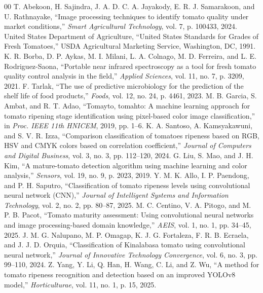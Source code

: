\documentclass[conference,pageno]{IEEEtran}
\begin{document}
\begin{thebibliography}{00}
 T. Abekoon, H. Sajindra, J. A. D. C. A. Jayakody, E. R. J. Samarakoon, and U. Rathnayake, ``Image processing techniques to identify tomato quality under market conditions,'' \textit{Smart Agricultural Technology}, vol. 7, p. 100433, 2024.
 United States Department of Agriculture, ``United States Standards for Grades of Fresh Tomatoes,'' USDA Agricultural Marketing Service, Washington, DC, 1991.
 K. R. Borba, D. P. Aykas, M. I. Milani, L. A. Colnago, M. D. Ferreira, and L. E. Rodriguez-Saona, ``Portable near infrared spectroscopy as a tool for fresh tomato quality control analysis in the field,'' \textit{Applied Sciences}, vol. 11, no. 7, p. 3209, 2021.
 F. Tarlak, ``The use of predictive microbiology for the prediction of the shelf life of food products,'' \textit{Foods}, vol. 12, no. 24, p. 4461, 2023.
 M. B. Garcia, S. Ambat, and R. T. Adao, ``Tomayto, tomahto: A machine learning approach for tomato ripening stage identification using pixel-based color image classification,'' in \textit{Proc. IEEE 11th HNICEM}, 2019, pp. 1--6.
 K. A. Santoso, A. Kamsyakawuni, and S. V. R. Izza, ``Comparison classification of tomatoes ripeness based on RGB, HSV and CMYK colors based on correlation coefficient,'' \textit{Journal of Computers and Digital Business}, vol. 3, no. 3, pp. 112--120, 2024.
 G. Liu, S. Mao, and J. H. Kim, ``A mature-tomato detection algorithm using machine learning and color analysis,'' \textit{Sensors}, vol. 19, no. 9, p. 2023, 2019.
 Y. M. K. Allo, I. P. Paendong, and P. H. Saputro, ``Classification of tomato ripeness levels using convolutional neural network (CNN),'' \textit{Journal of Intelligent Systems and Information Technology}, vol. 2, no. 2, pp. 80--87, 2025.
 M. C. Centino, V. A. Pitogo, and M. P. B. Pacot, ``Tomato maturity assessment: Using convolutional neural networks and image processing-based domain knowledge,'' \textit{AEIS}, vol. 1, no. 1, pp. 34--45, 2025.
 J. M. G. Nalupano, M. P. Omagap, K. J. G. Fortaleza, F. R. B. Ecraela, and J. J. D. Orquia, ``Classification of Kinalabasa tomato using convolutional neural network,'' \textit{Journal of Innovative Technology Convergence}, vol. 6, no. 3, pp. 99--110, 2024.
 Z. Yang, Y. Li, Q. Han, H. Wang, C. Li, and Z. Wu, ``A method for tomato ripeness recognition and detection based on an improved YOLOv8 model,'' \textit{Horticulturae}, vol. 11, no. 1, p. 15, 2025.

\end{thebibliography}
\end{document}
